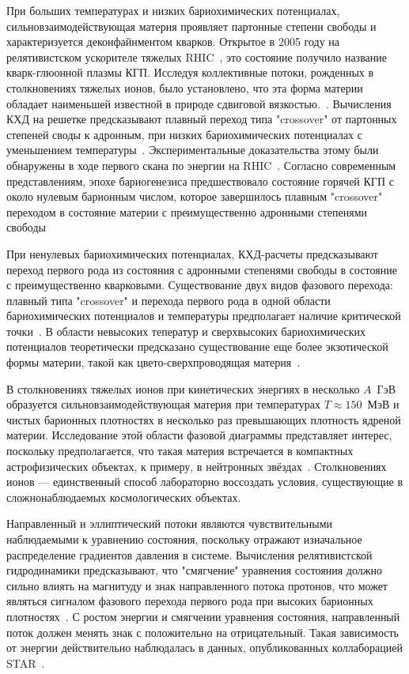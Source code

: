 При больших температурах и низких бариохимических потенциалах, сильновзаимодействующая материя проявляет партонные степени свободы и характеризуется деконфайнментом кварков. 
Открытое в 2005 году на релятивистском ускорителе тяжелых RHIC~\cite{STAR:2005gfr}, это состояние получило название кварк-глюонной плазмы КГП.
Исследуя коллективные потоки, рожденных в столкновениях тяжелых ионов, было установлено, что эта форма материи обладает наименьшей известной в природе сдвиговой вязкостью.~\cite{Shen:2015msa}.
Вычисления КХД на решетке предсказывают плавный переход типа "crossover" от партонных степеней своды к адронным, при низких бариохимических потенциалах с уменьшением температуры~\cite{HotQCD:2014kol, Karsch:2003va}.
Экспериментальные доказательства этому были обнаружены в ходе первого скана по энергии на RHIC~\cite{Odyniec:2019kfh}.
Согласно современным представлениям, эпохе бариогенезиса предшествовало состояние горячей КГП с около нулевым барионным числом, которое завершилось плавным "crossover" переходом в состояние материи с преимущественно адронными степенями свободы~\cite{Esumi:2022uas}

При ненулевых бариохимических потенциалах, КХД-расчеты предсказывают переход первого рода из состояния с адронными степенями свободы в состояние с преимущественно кварковыми.
Существование двух видов фазового перехода: плавный типа "crossover" и перехода первого рода в одной области бариохимических потенциалов и температуры предполагает наличие критической точки~\cite{Odyniec:2019kfh}.
В области невысоких теператур и сверхвысоких бариохимических потенциалов теоретически предсказано существование еще более экзотической формы материи, такой как цвето-сверхпроводящая материя~\cite{McLerran:2008ux}.

В столкновениях тяжелых ионов при кинетических энергиях в несколько $A$~ГэВ образуется сильновзаимодействующая материя при температурах $T\approx150$~МэВ и чистых барионных плотностях в несколько раз превышающих плотность ядреной материи.
Исследование этой области фазовой диаграммы представляет интерес, поскольку предполагается, что такая материя встречается в компактных астрофизических объектах, к примеру, в нейтронных звёздах~\cite{Danielewicz:2002pu}.
Столкновениях ионов --- единственный способ лабораторно воссоздать условия, существующие в сложнонаблюдаемых космологических объектах.

Направленный и эллиптический потоки являются чувствительными наблюдаемыми к уравнению состояния, поскольку отражают изначальное распределение градиентов давления в системе.
Вычисления релятивистской гидродинамики предсказывают, что "смягчение" уравнения состояния должно сильно влиять на магнитуду и знак направленного потока протонов, что может являться сигналом фазового перехода первого рода при высоких барионных плотностях~\cite{Rischke:1995pe, Stoecker:2004qu}.
С ростом энергии и смягчении уравнения состояния, направленный поток должен менять знак с положительно на отрицательный.
Такая зависимость от энергии действительно наблюдалась в данных, опубликованных коллаборацией STAR~\cite{STAR:2014clz}.

